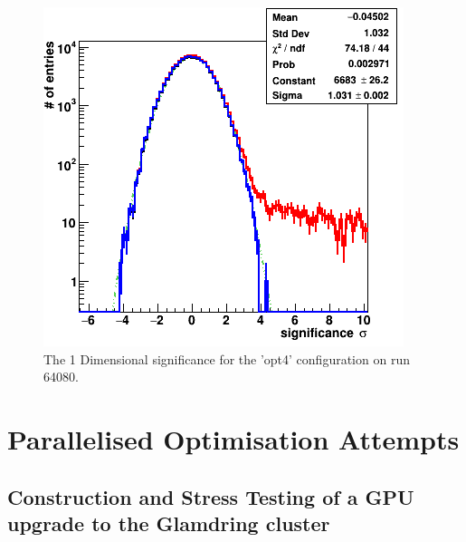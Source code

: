 \begin{figure}[ht] 
        \centering \includegraphics[width=0.5\columnwidth]{figures/opt4_sig.png}

        \caption{
                \label{fig:opt4_sig1D} The 1 Dimensional significance for the 'opt4' configuration on run 64080.
        }
\end{figure}

\section{Parallelised Optimisation Attempts}
\subsection{Construction and Stress Testing of a GPU upgrade to the Glamdring cluster}
